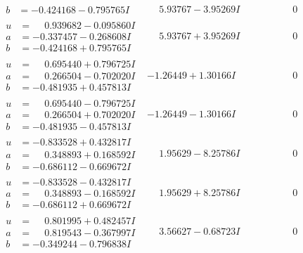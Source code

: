 \documentclass[1p]{elsarticle_modified}
\theoremstyle{definition}
\begin{document}
$$\begin{array}{c|c|c}
\begin{aligned}
b &= -0.424168 - 0.795765 I\end{aligned}
 & \phantom{-}5.93767 - 3.95269 I & \phantom{-0.000000 } 0 \\ \hline\begin{aligned}
u &= \phantom{-}0.939682 - 0.095860 I \\
a &= -0.337457 - 0.268608 I \\
b &= -0.424168 + 0.795765 I\end{aligned}
 & \phantom{-}5.93767 + 3.95269 I & \phantom{-0.000000 } 0 \\ \hline\begin{aligned}
u &= \phantom{-}0.695440 + 0.796725 I \\
a &= \phantom{-}0.266504 - 0.702020 I \\
b &= -0.481935 + 0.457813 I\end{aligned}
 & -1.26449 + 1.30166 I & \phantom{-0.000000 } 0 \\ \hline\begin{aligned}
u &= \phantom{-}0.695440 - 0.796725 I \\
a &= \phantom{-}0.266504 + 0.702020 I \\
b &= -0.481935 - 0.457813 I\end{aligned}
 & -1.26449 - 1.30166 I & \phantom{-0.000000 } 0 \\ \hline\begin{aligned}
u &= -0.833528 + 0.432817 I \\
a &= \phantom{-}0.348893 + 0.168592 I \\
b &= -0.686112 - 0.669672 I\end{aligned}
 & \phantom{-}1.95629 - 8.25786 I & \phantom{-0.000000 } 0 \\ \hline\begin{aligned}
u &= -0.833528 - 0.432817 I \\
a &= \phantom{-}0.348893 - 0.168592 I \\
b &= -0.686112 + 0.669672 I\end{aligned}
 & \phantom{-}1.95629 + 8.25786 I & \phantom{-0.000000 } 0 \\ \hline\begin{aligned}
u &= \phantom{-}0.801995 + 0.482457 I \\
a &= \phantom{-}0.819543 - 0.367997 I \\
b &= -0.349244 - 0.796838 I\end{aligned}
 & \phantom{-}3.56627 - 0.68723 I & \phantom{-0.000000 } 0 \\ \hline\begin{aligned}

\end{aligned}
\end{array}$$
\end{document}
